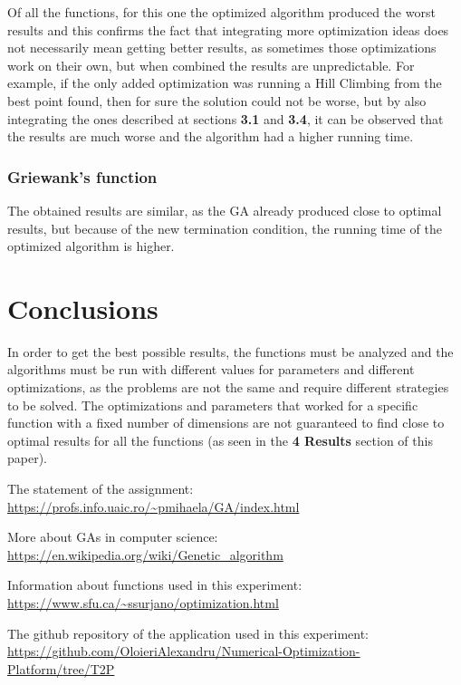 \documentclass[a4paper]{article}
\begin{document}
	Of all the functions, for this one the optimized algorithm produced the worst results and this confirms the fact that integrating more optimization ideas does not necessarily mean getting better results, as sometimes those optimizations work on their own, but when combined the results are unpredictable. For example, if the only added optimization was running a Hill Climbing from the best point found, then for sure the solution could not be worse, but by also integrating the ones described at sections \textbf{3.1} and \textbf{3.4}, it can be observed that the results are much worse and the algorithm had a higher running time.
	
	\subsubsection{Griewank's function}
	
	The obtained results are similar, as the GA already produced close to optimal results, but because of the new termination condition, the running time of the optimized algorithm is higher.
	
	\section{Conclusions}
	
	In order to get the best possible results, the functions must be analyzed and the algorithms must be run with different values for parameters and different optimizations, as the problems are not the same and require different strategies to be solved. The optimizations and parameters that worked for a specific function with a fixed number of dimensions are not guaranteed to find close to optimal results for all the functions (as seen in the \textbf{4 Results} section of this paper).
	
	\begin{thebibliography}{9}
		
		The statement of the assignment:
		\url{https://profs.info.uaic.ro/~pmihaela/GA/index.html}
		
		More about GAs in computer science:
		\url{https://en.wikipedia.org/wiki/Genetic_algorithm}
		
		Information about functions used in this experiment:
		\url{https://www.sfu.ca/~ssurjano/optimization.html}
		
		The github repository of the application used in this experiment:
		\url{https://github.com/OloieriAlexandru/Numerical-Optimization-Platform/tree/T2P}
		
	\end{thebibliography}
	
\end{document}
